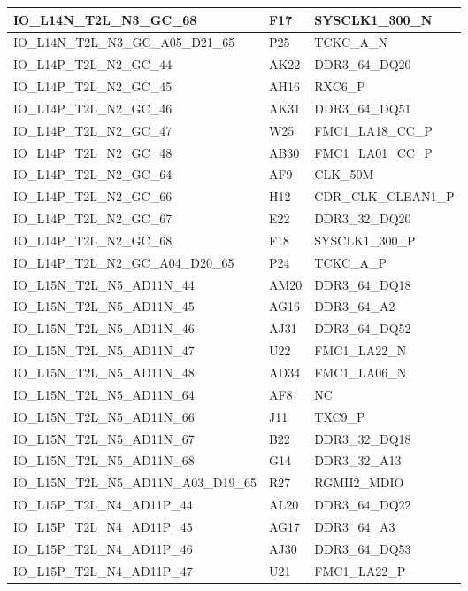 \begin{footnotesize}
\begin{longtable}{|p{7cm}|p{1cm}|p{5cm}|}
IO\_L14N\_T2L\_N3\_GC\_68	&	F17	&	SYSCLK1\_300\_N	\\ \hline
IO\_L14N\_T2L\_N3\_GC\_A05\_D21\_65	&	P25	&	TCKC\_A\_N	\\ \hline
IO\_L14P\_T2L\_N2\_GC\_44	&	AK22	&	DDR3\_64\_DQ20	\\ \hline
IO\_L14P\_T2L\_N2\_GC\_45	&	AH16	&	RXC6\_P	\\ \hline
IO\_L14P\_T2L\_N2\_GC\_46	&	AK31	&	DDR3\_64\_DQ51	\\ \hline
IO\_L14P\_T2L\_N2\_GC\_47	&	W25	&	FMC1\_LA18\_CC\_P	\\ \hline
IO\_L14P\_T2L\_N2\_GC\_48	&	AB30	&	FMC1\_LA01\_CC\_P	\\ \hline
IO\_L14P\_T2L\_N2\_GC\_64	&	AF9	&	CLK\_50M	\\ \hline
IO\_L14P\_T2L\_N2\_GC\_66	&	H12	&	CDR\_CLK\_CLEAN1\_P	\\ \hline
IO\_L14P\_T2L\_N2\_GC\_67	&	E22	&	DDR3\_32\_DQ20	\\ \hline
IO\_L14P\_T2L\_N2\_GC\_68	&	F18	&	SYSCLK1\_300\_P	\\ \hline
IO\_L14P\_T2L\_N2\_GC\_A04\_D20\_65	&	P24	&	TCKC\_A\_P	\\ \hline
IO\_L15N\_T2L\_N5\_AD11N\_44	&	AM20	&	DDR3\_64\_DQ18	\\ \hline
IO\_L15N\_T2L\_N5\_AD11N\_45	&	AG16	&	DDR3\_64\_A2	\\ \hline
IO\_L15N\_T2L\_N5\_AD11N\_46	&	AJ31	&	DDR3\_64\_DQ52	\\ \hline
IO\_L15N\_T2L\_N5\_AD11N\_47	&	U22	&	FMC1\_LA22\_N	\\ \hline
IO\_L15N\_T2L\_N5\_AD11N\_48	&	AD34	&	FMC1\_LA06\_N	\\ \hline
IO\_L15N\_T2L\_N5\_AD11N\_64	&	AF8	&	NC	\\ \hline
IO\_L15N\_T2L\_N5\_AD11N\_66	&	J11	&	TXC9\_P	\\ \hline
IO\_L15N\_T2L\_N5\_AD11N\_67	&	B22	&	DDR3\_32\_DQ18	\\ \hline
IO\_L15N\_T2L\_N5\_AD11N\_68	&	G14	&	DDR3\_32\_A13	\\ \hline
IO\_L15N\_T2L\_N5\_AD11N\_A03\_D19\_65	&	R27	&	RGMII2\_MDIO	\\ \hline
IO\_L15P\_T2L\_N4\_AD11P\_44	&	AL20	&	DDR3\_64\_DQ22	\\ \hline
IO\_L15P\_T2L\_N4\_AD11P\_45	&	AG17	&	DDR3\_64\_A3	\\ \hline
IO\_L15P\_T2L\_N4\_AD11P\_46	&	AJ30	&	DDR3\_64\_DQ53	\\ \hline
IO\_L15P\_T2L\_N4\_AD11P\_47	&	U21	&	FMC1\_LA22\_P	\\ \hline

\end{longtable}
\end{footnotesize}

